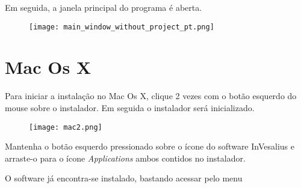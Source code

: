 Em seguida, a janela principal do programa é aberta.

\begin{figure}[!htb]
\centering
\texttt{[image: main\_window\_without\_project\_pt.png]}
\end{figure}

\section{Mac Os X}

Para iniciar a instalação no Mac Os X, clique 2 vezes com o botão esquerdo do mouse sobre o instalador.
Em seguida o instalador será inicializado.

\begin{figure}[!htb]
\centering
\texttt{[image: mac2.png]}
\end{figure}

Mantenha o botão esquerdo pressionado sobre o ícone do software InVesalius e arraste-o para o ícone \textit{Applications}
ambos contidos no instalador.


O software já encontra-se instalado, bastando acessar pelo menu

